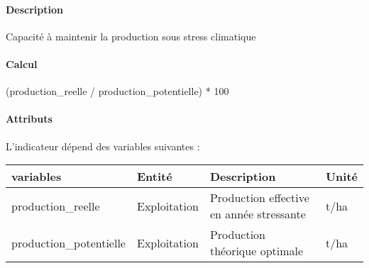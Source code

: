 \documentclass[
]{article}
\newenvironment{Shaded}{\begin{snugshade}}{\end{snugshade}}
\newcommand{\NormalTok}[1]{#1}
\begin{document}
\paragraph{Description}\label{description-22}

Capacité à maintenir la production sous stress climatique

\paragraph{Calcul}\label{calcul-22}

\begin{Shaded}
\begin{Highlighting}[]
\NormalTok{(production\_reelle / production\_potentielle) * 100}
\end{Highlighting}
\end{Shaded}

\paragraph{Attributs}\label{attributs-40}

L'indicateur dépend des variables suivantes :

\begin{longtable}[]{@{}
  >{\raggedright\arraybackslash}p{}
  >{\raggedright\arraybackslash}p{}
  >{\raggedright\arraybackslash}p{}
  >{\raggedright\arraybackslash}p{}@{}}
\toprule\noalign{}
\begin{minipage}[b]{\linewidth}\raggedright
\textbf{variables}
\end{minipage} & \begin{minipage}[b]{\linewidth}\raggedright
\textbf{Entité}
\end{minipage} & \begin{minipage}[b]{\linewidth}\raggedright
\textbf{Description}
\end{minipage} & \begin{minipage}[b]{\linewidth}\raggedright
\textbf{Unité}
\end{minipage} \\
\midrule\noalign{}
\endhead
\bottomrule\noalign{}
\endlastfoot
production\_reelle & Exploitation & Production effective en année
stressante & t/ha \\
production\_potentielle & Exploitation & Production théorique optimale &
t/ha \\
\end{longtable}
\end{document}
